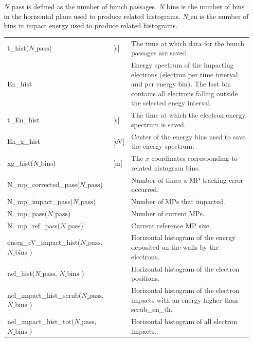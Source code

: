 \documentclass[a4paper,12pt]{article}
\begin{document}
$N\_{\mathrm{pass}}$ is defined as the number of bunch passages.
$N\_{\mathrm{bins}}$ is the number of bins in the horizontal plane used to produce related histograms.
$N\_\mathrm{en}$ is the number of bins in impact energy used to produce related histograms.
\begin{longtable}
    {p{}p{}p{}}
    \hline\endfirsthead\hline\endhead
    \rowcolor{Gray}\multicolumn{3}{p{.97\textwidth}}{
    \textbf{Variables saved at each bunch passage}}
    \\\hline
    t\_hist($N\_{\mathrm{pass}}$) & [s] & The time at which data for the bunch passages are saved.\\\hline

    En\_hist &  & Energy spectrum of the impacting electrons (electron per time interval and per energy bin). The last bin contains all electrons falling outside the selected enegy interval. \\\hline
    t\_En\_hist & [s] & The time at which the electron energy spectrum is saved.\\\hline
    En\_g\_hist &[eV]& Center of the energy bins used to save the energy spectrum.\\\hline

    xg\_hist($N\_{\mathrm{bins}}$) & [m] & The $x$ coordinates corresponding to related histogram bins.\\\hline

    N\_mp\_corrected\_pass($N\_{\mathrm{pass}}$) & & Number of times a MP tracking error occurred. \\\hline
    N\_mp\_impact\_pass($N\_{\mathrm{pass}}$) & & Number of MPs that impacted. \\\hline
    N\_mp\_pass($N\_{\mathrm{pass}}$) & & Number of current MPs.\\\hline
    N\_mp\_ref\_pass($N\_{\mathrm{pass}}$) & & Current reference MP size.\\\hline
    energ\_eV\_impact\_hist($N\_{\mathrm{pass}}$, $N\_{\mathrm{bins}}$ ) & & Horizontal histogram of the energy deposited on the walls by the electrons.\\\hline
    nel\_hist($N\_{\mathrm{pass}}$, $N\_{\mathrm{bins}}$ ) & & Horizontal histogram of the electron positions.\\\hline
    nel\_impact\_hist\_scrub($N\_{\mathrm{pass}}$, $N\_{\mathrm{bins}}$ ) & & Horizontal histogram of the electron impacts with an energy higher than scrub\_en\_th.\\\hline
    nel\_impact\_hist\_tot($N\_{\mathrm{pass}}$, $N\_{\mathrm{bins}}$ ) & & Horizontal histogram of all electron impacts.\\\hline
\end{longtable}
\end{document}
